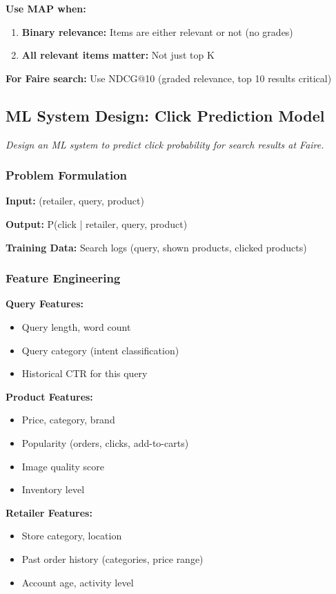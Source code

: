\documentclass[11pt,letterpaper]{article}
\begin{document}
\textbf{Use MAP when:}
\begin{enumerate}
    \item \textbf{Binary relevance:} Items are either relevant or not (no grades)
    \item \textbf{All relevant items matter:} Not just top K
\end{enumerate}

\textbf{For Faire search:} Use NDCG@10 (graded relevance, top 10 results critical)

\subsection{ML System Design: Click Prediction Model}

\textit{Design an ML system to predict click probability for search results at Faire.}

\subsubsection{Problem Formulation}

\textbf{Input:} (retailer, query, product)

\textbf{Output:} P(click | retailer, query, product)

\textbf{Training Data:} Search logs (query, shown products, clicked products)

\subsubsection{Feature Engineering}

\textbf{Query Features:}
\begin{itemize}
    \item Query length, word count
    \item Query category (intent classification)
    \item Historical CTR for this query
\end{itemize}

\textbf{Product Features:}
\begin{itemize}
    \item Price, category, brand
    \item Popularity (orders, clicks, add-to-carts)
    \item Image quality score
    \item Inventory level
\end{itemize}

\textbf{Retailer Features:}
\begin{itemize}
    \item Store category, location
    \item Past order history (categories, price range)
    \item Account age, activity level
\end{itemize}
\end{document}
